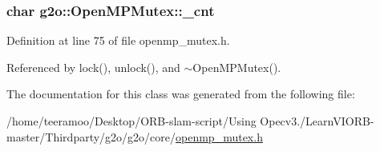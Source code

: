 \subsubsection[{\texorpdfstring{\+\_\+cnt}{_cnt}}]{\setlength{\rightskip}{0pt plus 5cm}char g2o\+::\+Open\+M\+P\+Mutex\+::\+\_\+cnt\hspace{0.3cm}{\ttfamily [protected]}}\hypertarget{classg2o_1_1OpenMPMutex_a0cb363393694ee0dd15f822fbda7645a}{}\label{classg2o_1_1OpenMPMutex_a0cb363393694ee0dd15f822fbda7645a}


Definition at line 75 of file openmp\+\_\+mutex.\+h.



Referenced by lock(), unlock(), and $\sim$\+Open\+M\+P\+Mutex().



The documentation for this class was generated from the following file\+:\begin{DoxyCompactItemize}
\item 
/home/teeramoo/\+Desktop/\+O\+R\+B-\/slam-\/script/\+Using Opecv3./\+Learn\+V\+I\+O\+R\+B-\/master/\+Thirdparty/g2o/g2o/core/\hyperlink{openmp__mutex_8h}{openmp\+\_\+mutex.\+h}\end{DoxyCompactItemize}
